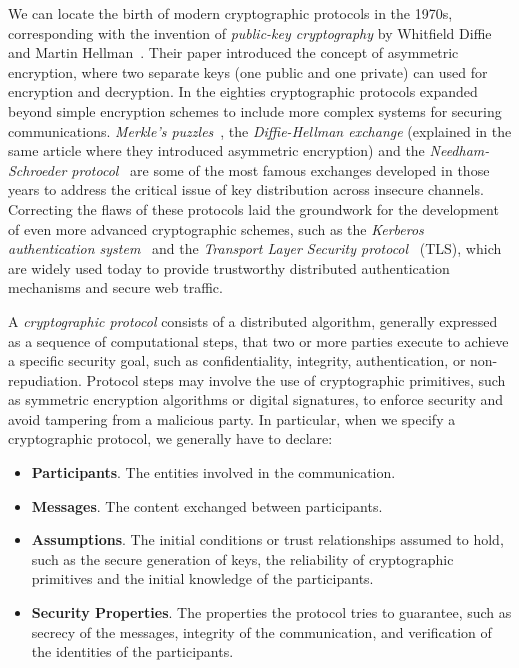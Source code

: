 We can locate the birth of modern cryptographic protocols in the 1970s, corresponding with the invention of \textit{public-key cryptography} by Whitfield Diffie and Martin Hellman~\cite{newdirections}. Their paper introduced the concept of asymmetric encryption, where two separate keys (one public and one private) can used for encryption and decryption. In the eighties cryptographic protocols expanded beyond simple encryption schemes to include more complex systems for securing communications. \textit{Merkle's puzzles}~\cite{merklepuzzle}, the \textit{Diffie-Hellman exchange} (explained in the same article where they introduced asymmetric encryption) and the \textit{Needham-Schroeder protocol}~\cite{needhamschroeder} are some of the most famous exchanges developed in those years to address the critical issue of key distribution across insecure channels. Correcting the flaws of these protocols laid the groundwork for the development of even more advanced cryptographic schemes, such as the \textit{Kerberos authentication system}~\cite{kerberos} and the \textit{Transport Layer Security protocol}~\cite{tls} (TLS), which are widely used today to provide trustworthy distributed authentication mechanisms and secure web traffic.

A \textit{cryptographic protocol} consists of a distributed algorithm, generally expressed as a sequence of computational steps, that two or more parties execute to achieve a specific security goal, such as confidentiality, integrity, authentication, or non-repudiation. Protocol steps may involve the use of cryptographic primitives, such as symmetric encryption algorithms or digital signatures, to enforce security and avoid tampering from a malicious party. In particular, when we specify a cryptographic protocol, we generally have to declare:
\begin{itemize}
    \item \textbf{Participants}. The entities involved in the communication.
    \item \textbf{Messages}. The content exchanged between participants.
    \item \textbf{Assumptions}. The initial conditions or trust relationships assumed to hold, such as the secure generation of keys, the reliability of cryptographic primitives and the initial knowledge of the participants.
    \item \textbf{Security Properties}. The properties the protocol tries to guarantee, such as secrecy of the messages, integrity of the communication, and verification of the identities of the participants.
\end{itemize}


